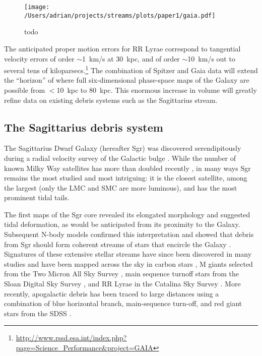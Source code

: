 \documentclass{emulateapj}
\begin{document}
\begin{figure}[h]
\begin{center}
\texttt{[image: /Users/adrian/projects/streams/plots/paper1/gaia.pdf]}
\caption{ todo }\label{fig:gaia_errors}
\end{center}
\end{figure}

The anticipated proper motion errors for RR Lyrae correspond to
tangential velocity errors of order $\sim$1~km/s at 30~kpc, and of
order $\sim$10~km/s out to several tens of
kiloparsecs.\footnote{\url{http://www.rssd.esa.int/index.php?page=Science_Performance&project=GAIA}}
The combination of Spitzer and Gaia data will extend the ``horizon''
of where full six-dimensional phase-space maps of the Galaxy are
possible from $<$10~kpc to 80~kpc. This enormous increase in volume
will greatly refine data on existing debris systems such as the
Sagittarius stream.

\subsection{The Sagittarius debris system}
\label{sec:sgr}
The Sagittarius Dwarf Galaxy (hereafter Sgr) was discovered
serendipitously during a radial velocity survey of the Galactic bulge
\citep{ibata94}. While the number of known Milky Way satellites has
more than doubled recently \citep[e.g.,][]{mcconnachie12}, in many
ways Sgr remains the most studied and most intriguing: it is the
closest satellite, among the largest (only the LMC and SMC are more
luminous), and has the most prominent tidal tails.

The first maps of the Sgr core \citep{ibata94, ibata95} revealed its
elongated morphology and suggested tidal deformation, as would be
anticipated from its proximity to the Galaxy. Subsequent N-body models
confirmed this interpretation \citep{velazquez95} and showed that
debris from Sgr should form coherent streams of stars that encircle
the Galaxy \citep{johnston95}. Signatures of these extensive stellar
streams have since been discovered in many studies and have been
mapped across the sky in carbon stars \citep{totten98}, M giants
selected from the Two Micron All Sky Survey \citep{majewski03}, main
sequence turnoff stars from the Sloan Digital Sky Survey
\citep{belokurov06}, and RR Lyrae in the Catalina Sky Survey
\citep{drake13}. More recently, apogalactic debris has been traced to
large distances using a combination of blue horizontal branch,
main-sequence turn-off, and red giant stars from the SDSS
\citep{belokurov13}.
\end{document}
